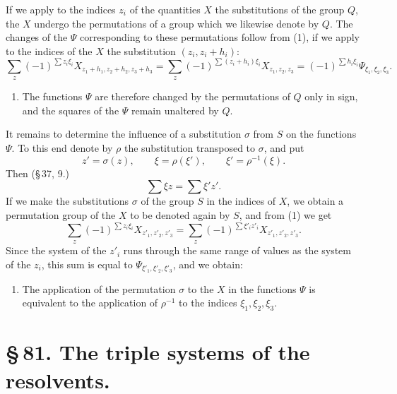 \documentclass[11pt]{article}
\begin{document}
If we apply to the indices $z_i$ of the quantities $X$ the substitutions of the group $Q$, the $X$ undergo the permutations of a group which we likewise denote by $Q$. The changes of the $\Psi$ corresponding to these permutations follow from (1), if we apply to the indices of the $X$ the substitution $(z_i,z_i+h_i)$:
\begin{equation}
 \sum_z (-1)^{\sum z_i\xi_i}X_{z_1+h_1,z_2+h_2,z_3+h_3}
 =\sum_z (-1)^{\sum (z_i+h_i)\xi_i}X_{z_1,z_2,z_3}
 =(-1)^{\sum h_i\xi_i}\Psi_{\xi_1,\xi_2,\xi_3}.
 \tag{2}
\end{equation}
\begin{enumerate}[label=\arabic*.,leftmargin=2.8em]
\item The functions $\Psi$ are therefore changed by the permutations of $Q$ only in sign, and the squares of the $\Psi$ remain unaltered by $Q$.
\end{enumerate}
It remains to determine the influence of a substitution $\sigma$ from $S$ on the functions $\Psi$. To this end denote by $\rho$ the substitution transposed to $\sigma$, and put
\begin{equation}
 z'=\sigma(z),\qquad \xi=\rho(\xi'),\qquad \xi'=\rho^{-1}(\xi).
 \tag{3}
\end{equation}
Then (\S\,37, 9.)
\begin{equation}
 \sum \xi z=\sum \xi' z'.
 \tag{4}
\end{equation}
If we make the substitutions $\sigma$ of the group $S$ in the indices of $X$, we obtain a permutation group of the $X$ to be denoted again by $S$, and from (1) we get
\[
 \sum_z(-1)^{\sum z_i\xi_i}X_{z'_1,z'_2,z'_3}
 =\sum_z(-1)^{\sum \xi'_i z'_i}X_{z'_1,z'_2,z'_3}.
\]
Since the system of the $z'_i$ runs through the same range of values as the system of the $z_i$, this sum is equal to $\Psi_{\xi'_1,\xi'_2,\xi'_3}$, and we obtain:
\begin{enumerate}[label=\arabic*.,leftmargin=2.8em,start=2]
\item The application of the permutation $\sigma$ to the $X$ in the functions $\Psi$ is equivalent to the application of $\rho^{-1}$ to the indices $\xi_1,\xi_2,\xi_3$.
\end{enumerate}

\section*{\S\,81. The triple systems of the resolvents.}
\end{document}

